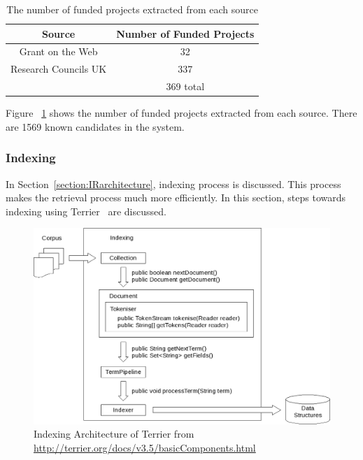 \begin{table}
\centering
\begin{tabular}{|c|c|}
\hline \textbf{Source} & \textbf{Number of Funded Projects} \\
\hline Grant on the Web & 32 \\
\hline Research Councils UK & 337 \\
\hline   & 369 total \\ 
\hline
\end{tabular}
\caption{The number of funded projects extracted from each source} \label{table:stats}
\end{table}
Figure ~\ref{table:stats} shows the number of funded projects extracted from each source. There are 1569 known candidates in the system.

\subsubsection{Indexing}
In Section~\ref{section:IRarchitecture}, indexing process is discussed. This process makes the retrieval process much more efficiently. In this section, 
steps towards indexing using Terrier~\cite{terrier} are discussed.
\begin{figure}
\centering
\includegraphics[scale=0.4]{./figures/terrierindexing.png}
\caption{Indexing Architecture of Terrier from \protect\url{http://terrier.org/docs/v3.5/basicComponents.html}} \label{fig:terrierindexing} 
\end{figure}

